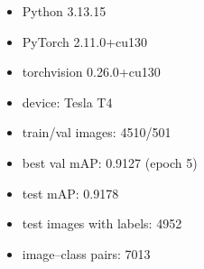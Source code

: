 \begin{itemize}
\item Python 3.13.15
\item PyTorch 2.11.0+cu130
\item torchvision 0.26.0+cu130
\item device: Tesla T4
\item train/val images: 4510/501
\item best val mAP: 0.9127 (epoch 5)
\item test mAP: 0.9178
\item test images with labels: 4952
\item image--class pairs: 7013
\end{itemize}
